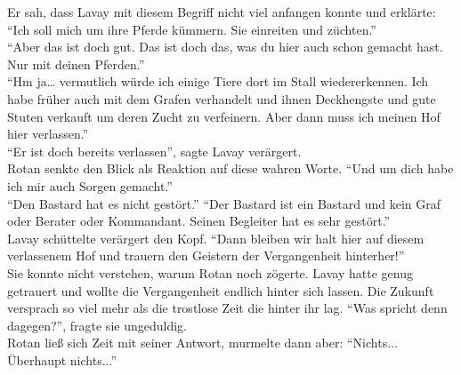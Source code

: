 Er sah, dass Lavay mit diesem Begriff nicht viel anfangen konnte und erklärte: ``Ich soll mich um 
ihre Pferde kümmern. Sie einreiten und züchten.''\\
``Aber das ist doch gut. Das ist doch das, was du hier auch schon gemacht hast. Nur mit deinen 
Pferden.''\\
``Hm ja… vermutlich würde ich einige Tiere dort im Stall wiedererkennen. Ich habe früher auch mit 
dem Grafen verhandelt und ihnen Deckhengste und gute Stuten verkauft um deren Zucht zu verfeinern. 
Aber dann muss ich meinen Hof hier verlassen.''\\
``Er ist doch bereits verlassen'', sagte Lavay verärgert.\\
Rotan senkte den Blick als Reaktion auf diese wahren Worte. ``Und um dich habe ich mir auch Sorgen 
gemacht.''\\
``Den Bastard hat es nicht gestört.''
``Der Bastard ist ein Bastard und kein Graf oder Berater oder Kommandant. Seinen Begleiter hat es 
sehr gestört.''\\
Lavay schüttelte verärgert den Kopf. ``Dann bleiben wir halt hier auf diesem verlassenem Hof und 
trauern den Geistern der Vergangenheit hinterher!''\\
Sie konnte nicht verstehen, warum Rotan noch zögerte. Lavay hatte genug getrauert und wollte die 
Vergangenheit endlich hinter sich lassen. Die Zukunft versprach so viel mehr als die trostlose Zeit 
die hinter ihr lag. ``Was spricht denn dagegen?'', fragte sie ungeduldig.\\
Rotan ließ sich Zeit mit seiner Antwort, murmelte dann aber: ``Nichts... Überhaupt nichts...''\\

